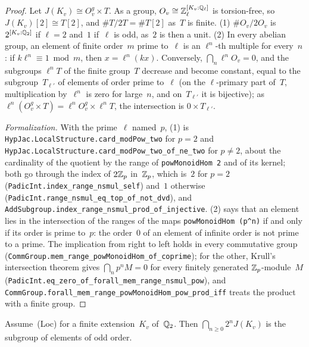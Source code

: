 \begin{proof}
\leanok
Let $J(K_v) \cong O_v^g \times T$. As a group, $O_v \cong \mathbb{Z}_\ell^{[K_v : \mathbb{Q}_\ell]}$ is
torsion-free, so $J(K_v)[2] \cong T[2]$, and $\#T/2T = \#T[2]$ as~$T$ is finite.
(1) $\#O_v/2O_v$ is $2^{[K_v : \mathbb{Q}_2]}$ if $\ell = 2$ and~$1$ if~$\ell$ is odd, as~$2$ is then a
unit. (2) In every abelian group, an element of finite order~$m$ prime to~$\ell$ is an
$\ell^n$-th multiple for every~$n$: if $k\ell^n \equiv 1 \bmod m$, then $x = \ell^n(kx)$.
Conversely, $\bigcap_n \ell^nO_v = 0$, and the subgroups $\ell^nT$ of the finite group~$T$
decrease and become constant, equal to the subgroup~$T_{\ell'}$ of elements of order prime
to~$\ell$ (on the $\ell$-primary part of~$T$, multiplication by~$\ell^n$ is zero for large~$n$, and
on~$T_{\ell'}$ it is bijective); as $\ell^n(O_v^g \times T) = \ell^nO_v^g \times \ell^nT$, the
intersection is $0 \times T_{\ell'}$.

\emph{Formalization.} With the prime~$\ell$ named~$p$, (1) is
\texttt{HypJac.LocalStructure.card\_modPow\_two} for $p = 2$ and
\texttt{HypJac.LocalStructure.card\_modPow\_two\_of\_ne\_two} for $p \ne 2$, about the cardinality
of the quotient by the range of \texttt{powMonoidHom 2} and of its kernel; both go through the
index of $2\mathbb{Z}_p$ in~$\mathbb{Z}_p$, which is~$2$ for $p = 2$ (\texttt{PadicInt.index\_range\_nsmul\_self})
and~$1$ otherwise (\texttt{PadicInt.range\_nsmul\_eq\_top\_of\_not\_dvd}), and
\texttt{AddSubgroup.index\_range\_nsmul\_prod\_of\_injective}. (2) says that an element lies in the
intersection of the ranges of the maps \texttt{powMonoidHom (p\textasciicircum{}n)} if and only if
its order is prime to~$p$: the order~$0$ of an element of infinite order is not prime to a prime.
The implication from right to left holds in every commutative group
(\texttt{CommGroup.mem\_range\_powMonoidHom\_of\_coprime}); for the other, Krull's intersection
theorem gives $\bigcap_n p^n M = 0$ for every finitely generated $\mathbb{Z}_p$-module~$M$
(\texttt{PadicInt.eq\_zero\_of\_forall\_mem\_range\_nsmul\_pow}), and
\texttt{CommGroup.forall\_mem\_range\_powMonoidHom\_pow\_prod\_iff} treats the product with a finite
group.
\end{proof}

\begin{lemma}[The case $\ell = 2$]
\label{lem:ds-loc-two}
\leanok
{}
Assume~(Loc) for a finite extension~$K_v$ of~$\mathbb{Q}_2$. Then $\bigcap_{n \ge 0} 2^nJ(K_v)$ is the
subgroup of elements of odd order.
\end{lemma}

